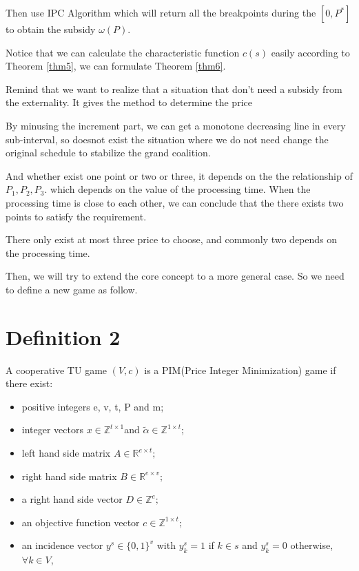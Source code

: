 Then use IPC Algorithm which will return all the breakpoints during the $[0, P^*]$ to obtain the subsidy $\omega(P)$.

Notice that we can calculate the characteristic function $c(s)$ easily according to Theorem \ref{thm5}, we can formulate Theorem \ref{thm6}.


Remind that we want to realize that a situation that don't need a subsidy from the externality.
It gives the method to determine the price

By minusing the increment part, we can get a monotone decreasing line in every sub-interval, so doesnot exist the situation where we do not need change the original schedule to stabilize the grand coalition.

And whether exist one point or two or three, it depends on the the relationship of $P_1,P_2, P_3$.
which depends on the value of the processing time. When the processing time is close to each other, we can conclude that the there exists two points to satisfy the requirement.

There only exist at most three price to choose, and commonly two depends on the processing time.


Then, we will try to extend the core concept to a more general case. So we need to define a new game as follow.

\section*{Definition 2}

A cooperative TU game $(V,c)$ is a PIM(Price Integer Minimization) game if there exist:

\begin{itemize}
	\item positive integers e, v, t, P and m;
	\item integer vectors $ x \in \mathbb{Z}^{t \times 1} $and $ \tilde{\alpha} \in \mathbb{Z}^{1 \times t} $;
	\item left hand side matrix  $A \in \mathbb{R} ^{e \times t};$
	\item right hand side matrix $B \in \mathbb{R} ^ {e \times v};$
	\item a right hand side vector $D \in \mathbb{Z} ^ {e};$
	\item an objective function vector
	$c \in \mathbb{Z}^{1 \times t};$
	\item an incidence vector $y^s \in \{0,1\}^v$ with $y^s_k = 1$ if $k \in s$ and $y^s_k = 0 $ otherwise, $\forall k \in V$,

\end{itemize}

